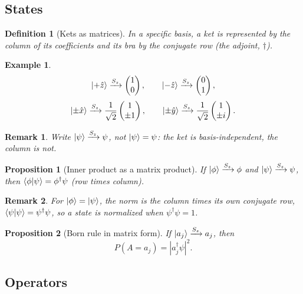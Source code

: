 \documentclass{article}
\newtheorem{definition}{Definition}
\newtheorem*{example}{Example}
\newtheorem{remark}{Remark}
\newtheorem{proposition}{Proposition}
\begin{document}
\subsection{States}
\begin{definition}[Kets as matrices]
    In a specific basis, a ket is represented by the column of its coefficients and its bra by the conjugate row (the adjoint, $\dagger$).
\end{definition}
\begin{example}
    \[\ket{+\hat{z}} \xrightarrow{S_z} \begin{pmatrix} 1 \\ 0 \end{pmatrix}, \qquad \ket{-\hat{z}} \xrightarrow{S_z} \begin{pmatrix} 0 \\ 1 \end{pmatrix},\]
    \[\ket{\pm\hat{x}} \xrightarrow{S_z} \frac{1}{\sqrt{2}}\begin{pmatrix} 1 \\ \pm 1 \end{pmatrix}, \qquad \ket{\pm\hat{y}} \xrightarrow{S_z} \frac{1}{\sqrt{2}}\begin{pmatrix} 1 \\ \pm i \end{pmatrix}.\]
\end{example}
\begin{remark}
    Write $\ket{\psi} \xrightarrow{S_z} \psi$, not $\ket{\psi} = \psi$: the ket is basis-independent, the column is not.
\end{remark}
\begin{proposition}[Inner product as a matrix product]
    If $\ket{\phi} \xrightarrow{S_z} \phi$ and $\ket{\psi} \xrightarrow{S_z} \psi$, then $\braket{\phi|\psi} = \phi^\dagger\psi$ (row times column).
\end{proposition}
\begin{remark}
    For $\ket{\phi} = \ket{\psi}$, the norm is the column times its own conjugate row, $\braket{\psi|\psi} = \psi^\dagger\psi$, so a state is normalized when $\psi^\dagger\psi = 1$.
\end{remark}
\begin{proposition}[Born rule in matrix form]
    If $\ket{a_j} \xrightarrow{S_z} a_j$, then
    \[P(A = a_j) = \left|a_j^\dagger\psi\right|^2.\]
\end{proposition}

\subsection{Operators}
\end{document}
